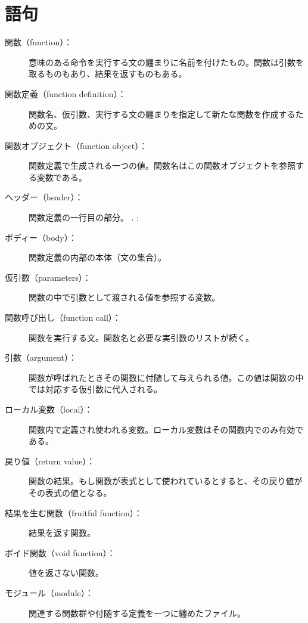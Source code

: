 \documentclass[a4j,12pt,makeidx]{jbook}
\begin{document}
\section{語句}
\begin{description}
\item[関数（function）：]意味のある命令を実行する文の纏まりに名前を付けたもの。関数は引数を取るものもあり、結果を返すものもある。

\item[関数定義（function definition）：]関数名、仮引数、実行する文の纏まりを指定して新たな関数を作成するための文。  

\item[関数オブジェクト（function object）：]関数定義で生成される一つの値。関数名はこの関数オブジェクトを参照する変数である。

\item[ヘッダー（header）：]関数定義の一行目の部分。 .
:%

\item[ボディー（body）：]関数定義の内部の本体（文の集合）。 

\item[仮引数（parameters）：]関数の中で引数として渡される値を参照する変数。 

\item[関数呼び出し（function call）：] 関数を実行する文。関数名と必要な実引数のリストが続く。

\item[引数（argument）：]関数が呼ばれたときその関数に付随して与えられる値。この値は関数の中では対応する仮引数に代入される。  

\item[ローカル変数（local）：]関数内で定義され使われる変数。ローカル変数はその関数内でのみ有効である。  

\item[戻り値（return value）：]関数の結果。もし関数が表式として使われているとすると、その戻り値がその表式の値となる。 

\item[結果を生む関数（fruitful function）：]結果を返す関数。 

\item[ボイド関数（void function）：]値を返さない関数。 

\item[モジュール（module）：]関連する関数群や付随する定義を一つに纏めたファイル。 


\end{description}
\end{document}
